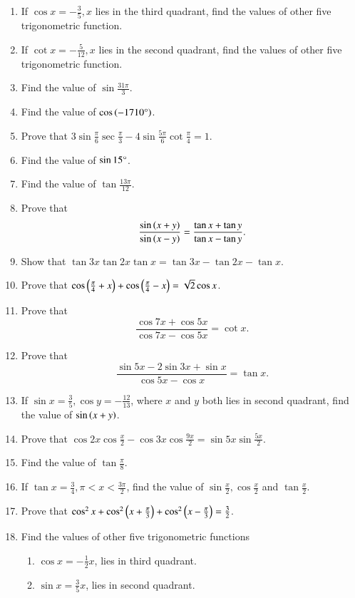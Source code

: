 \begin{enumerate}[label=\thesubsection.\arabic*,ref=\thesubsection.\theenumi,itemsep=1ex]
%
\item If $\cos x = -\frac{3}{5}, x$ lies in the third quadrant, find the values of other five trigonometric function.
%
\item If $\cot x = - \frac{5}{12}, x$ lies in the second quadrant, find the values of other five trigonometric function.
%
\item Find the value of $\sin \frac{31\pi}{3}$.
%
\item Find the value of $\cos\left(-1710\degree\right)$.
%
\item Prove that $3\sin\frac{\pi}{6}\sec\frac{\pi}{3}-4\sin\frac{5\pi}{6}\cot\frac{\pi}{4} = 1.$
%
\item Find the value of $\sin 15\degree$.
%
\item Find the value of $\tan\frac{13\pi}{12}$.
%
%
\item Prove that $$\frac{\sin\left(x+y\right)}{\sin\left(x-y\right)} = \frac{\tan x + \tan y}{\tan x - \tan y}.$$
%
%
\item Show that
$\tan3x\tan2x\tan x = \tan3x-\tan2x-\tan x$.
%
%
\item Prove that
$\cos\left(\frac{\pi}{4}+x\right) + \cos\left(\frac{\pi}{4}-x\right) = \sqrt 2\cos x$.
%
%
\item Prove that $$\frac{\cos7x+\cos5x}{\cos7x-\cos5x} = \cot x.$$
%
%
\item Prove that $$\frac{\sin5x-2\sin3x+\sin x}{\cos5x-\cos x} = \tan x.$$
%
%
\item If $\sin x=\frac{3}{5}, \cos y=-\frac{12}{13}$, where $x$ and $y$
both lies in second quadrant, find the value of
$\sin\left(x+y\right)$.
%
%
\item Prove that
$\cos2x\cos\frac{x}{2}-\cos3x\cos\frac{9x}{2}=\sin5x\sin\frac{5x}{2}$.
%
%
\item Find the value of $\tan\frac{\pi}{8}$.
%
%
\item If $\tan x=\frac{3}{4}, \pi<x<\frac{3\pi}{2}$, find the value of $\sin\frac{x}{2},\cos\frac{x}{2}$ and $\tan\frac{x}{2}$.
%
%
\item Prove that
$\cos^{2}x+\cos^{2}\left(x+\frac{\pi}{3}\right)+\cos^{2}\left(x-\frac{\pi}{3}\right)=\frac{3}{2}$.
%
\item Find the values of other five trigonometric functions 
\begin{enumerate}
	\item $\cos x=-\frac{1}{2}x$,  lies in third quadrant.
	\item $\sin x= \frac{3}{5}x$,  lies in second quadrant.

\end{enumerate}
\end{enumerate}
